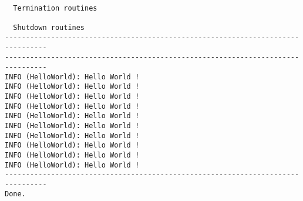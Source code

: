 \documentclass{article}
\begin{document}
{\begin{verbatim}
  Termination routines

  Shutdown routines
--------------------------------------------------------------------------------
--------------------------------------------------------------------------------
INFO (HelloWorld): Hello World !
INFO (HelloWorld): Hello World !
INFO (HelloWorld): Hello World !
INFO (HelloWorld): Hello World !
INFO (HelloWorld): Hello World !
INFO (HelloWorld): Hello World !
INFO (HelloWorld): Hello World !
INFO (HelloWorld): Hello World !
INFO (HelloWorld): Hello World !
INFO (HelloWorld): Hello World !
--------------------------------------------------------------------------------
Done.
\end{verbatim}
}

\end{document}
